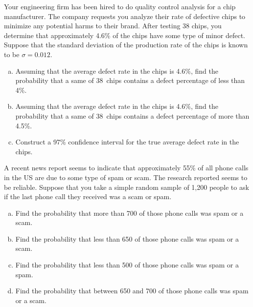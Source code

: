 \documentclass[11pt,letterpaper]{article}
\begin{document}

 Your engineering firm has been hired to do quality control analysis for a chip manufacturer. The company requests you analyze their rate of defective chips to minimize any potential harms to their brand. After testing 38 chips, you determine that approximately 4.6\% of the chips have some type of minor defect. Suppose that the standard deviation of the production rate of the chips is known to be $\sigma= 0.012$. 
	\begin{enumerate}[(a)]
	\item Assuming that the average defect rate in the chips is 4.6\%, find the probability that a same of 38~chips contains a defect percentage of less than 4\%.
	 \item Assuming that the average defect rate in the chips is 4.6\%, find the probability that a same of 38~chips contains a defect percentage of more than 4.5\%. 
	 \item Construct a 97\% confidence interval for the true average defect rate in the chips. 
	\end{enumerate}



\newpage



 A recent news report seems to indicate that approximately 55\% of all phone calls in the US are due to some type of spam or scam. The research reported seems to be reliable. Suppose that you take a simple random sample of 1,200 people to ask if the last phone call they received was a scam or spam. 
	\begin{enumerate}[(a)]
	\item Find the probability that more than 700 of those phone calls was spam or a scam. 
	\item Find the probability that less than 650 of those phone calls was spam or a scam.
	\item Find the probability that less than 500 of those phone calls was spam or a spam.
	\item Find the probability that between 650 and 700 of those phone calls was spam or a scam.  
	\end{enumerate}
\end{document}
